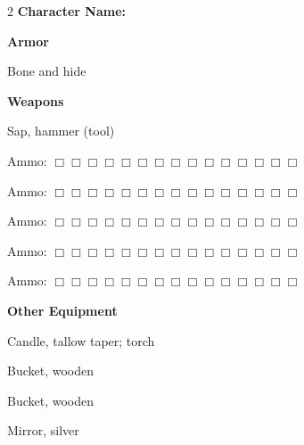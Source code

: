\documentclass[10pt]{article}
\begin{document}
\begin{multicols}{2}
\textbf{Character Name:} \hrulefill

\vspace{24pt}

\textbf{Armor}


Bone and hide




\hrulefill


\hrulefill


\hrulefill



\vspace{24pt}

\textbf{Weapons}


Sap, hammer (tool)




\hrulefill

Ammo: $\Box \Box \Box \Box \Box \Box \Box \Box \Box \Box \Box \Box \Box \Box \Box$ 


\hrulefill

Ammo: $\Box \Box \Box \Box \Box \Box \Box \Box \Box \Box \Box \Box \Box \Box \Box$ 


\hrulefill

Ammo: $\Box \Box \Box \Box \Box \Box \Box \Box \Box \Box \Box \Box \Box \Box \Box$ 


\hrulefill

Ammo: $\Box \Box \Box \Box \Box \Box \Box \Box \Box \Box \Box \Box \Box \Box \Box$ 


\hrulefill

Ammo: $\Box \Box \Box \Box \Box \Box \Box \Box \Box \Box \Box \Box \Box \Box \Box$ 



\vspace{24pt}

\textbf{Other Equipment}


Candle, tallow taper; torch


Bucket, wooden


Bucket, wooden


Mirror, silver




\hrulefill


\hrulefill


\hrulefill


\hrulefill


\hrulefill


\hrulefill


\hrulefill


\hrulefill



\end{multicols}
\end{document}
